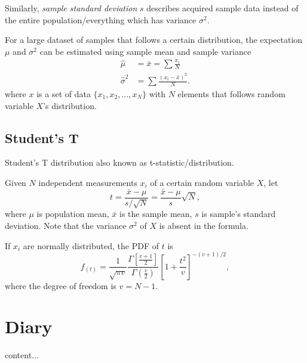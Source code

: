 \documentclass[11pt,a4paper,fleqn]{article}
\numberwithin{equation}{section}
\newcommand{\mean}[1]{\bar{#1}}
\begin{document}
Similarly, \textit{sample standard deviation} $s$ describes acquired sample data instead of the entire population/everything which has variance $\sigma^2$.

For a large dataset of samples that follows a certain distribution,
the expectation $\mu$ and $\sigma^2$ can be estimated using sample mean and sample variance
\begin{align*}
    \hat{\mu} &=\mean{x}=\sum \frac{x_i}{N} \\
    \hat{\sigma}^2 &= \sum \frac{(x_i-\mean{x})^2}{N}.
\end{align*}
where $x$ is a set of data $\{x_1,x_2,...,x_N\}$ with $N$ elements that follows random variable $X$'s distribution.

\subsection{Student's T}

Student's T distribution also known as t-statistic/distribution.

Given $N$ independent measurements $x_i$ of a certain random variable $X$, let
\begin{equation*}
    t=\frac{\bar{x}-\mu}{s/\sqrt{N}} = \frac{\bar{x}-\mu}{s}\sqrt{N},
\end{equation*}
where $\mu$ is population mean, $\bar{x}$ is the sample mean, $s$ is sample's standard deviation. Note that the variance $\sigma^2$ of $X$ is absent in the formula.

If $x_i$ are normally distributed, the PDF of $t$ is
\begin{equation*}
    f_(t)=\frac{1}{\sqrt{\pi v}}\frac{\Gamma[\frac{v+1}{2}]}{\Gamma(\frac{v}{2})}\left[1+\frac{t^2}{v}\right]^{-(v+1)/2},
\end{equation*}
where the degree of freedom is $v=N-1$.

\section{Diary}

\begin{fact}{}{}
    content...
\end{fact}
\end{document}
